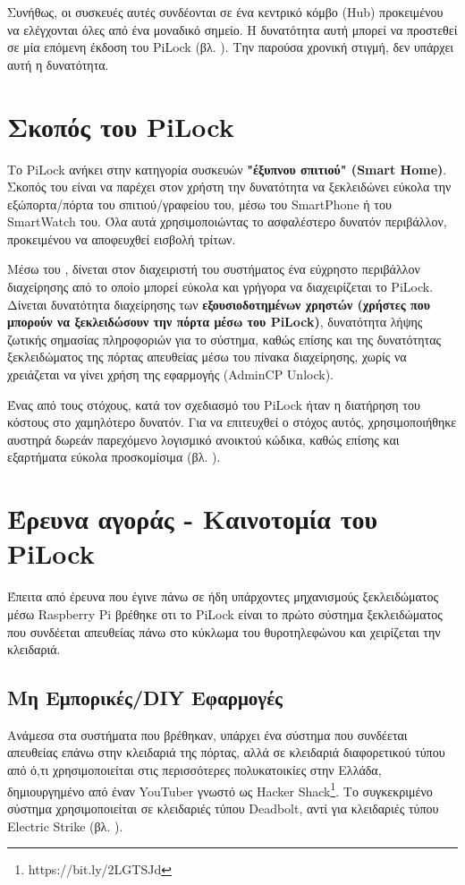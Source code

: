 	Συνήθως, οι συσκευές αυτές συνδέονται σε ένα κεντρικό κόμβο (Hub) προκειμένου να ελέγχονται όλες από ένα μοναδικό σημείο. Η δυνατότητα αυτή μπορεί να προστεθεί σε μία επόμενη έκδοση του PiLock (βλ. ). Την παρούσα χρονική στιγμή, δεν υπάρχει αυτή η δυνατότητα.

\section{Σκοπός του PiLock}
	Το PiLock ανήκει στην κατηγορία συσκευών \textbf{"έξυπνου σπιτιού" (Smart Home)}. Σκοπός του είναι να παρέχει στον χρήστη την δυνατότητα να ξεκλειδώνει εύκολα την εξώπορτα/πόρτα του σπιτιού/γραφείου του, μέσω του SmartPhone ή του SmartWatch του. Όλα αυτά χρησιμοποιώντας το ασφαλέστερο δυνατόν περιβάλλον, προκειμένου να αποφευχθεί εισβολή τρίτων.

	Μέσω του \textbf{}, δίνεται στον διαχειριστή του συστήματος ένα εύχρηστο περιβάλλον διαχείρησης από το οποίο μπορεί εύκολα και γρήγορα να διαχειρίζεται το PiLock. Δίνεται δυνατότητα διαχείρησης των \textbf{εξουσιοδοτημένων χρηστών (χρήστες που μπορούν να ξεκλειδώσουν την πόρτα μέσω του PiLock)}, δυνατότητα λήψης ζωτικής σημασίας πληροφοριών για το σύστημα, καθώς επίσης και της δυνατότητας ξεκλειδώματος της πόρτας απευθείας μέσω του πίνακα διαχείρησης, χωρίς να χρειάζεται να γίνει χρήση της εφαρμογής (AdminCP Unlock).

	Ένας από τους στόχους, κατά τον σχεδιασμό του PiLock ήταν η διατήρηση του κόστους στο χαμηλότερο δυνατόν. Για να επιτευχθεί ο στόχος αυτός, χρησιμοποιήθηκε αυστηρά δωρεάν παρεχόμενο λογισμικό ανοικτού κώδικα, καθώς επίσης και εξαρτήματα εύκολα προσκομίσιμα (βλ. ).

\section{Έρευνα αγοράς - Καινοτομία του PiLock}
	Έπειτα από έρευνα που έγινε πάνω σε ήδη υπάρχοντες μηχανισμούς ξεκλειδώματος μέσω Raspberry Pi βρέθηκε οτι το PiLock είναι το πρώτο σύστημα ξεκλειδώματος που συνδέεται απευθείας πάνω στο κύκλωμα του θυροτηλεφώνου και χειρίζεται την κλειδαριά. 

	\subsection{Μη Εμπορικές/DIY Εφαρμογές}
		Ανάμεσα στα συστήματα που βρέθηκαν, υπάρχει ένα σύστημα που συνδέεται απευθείας επάνω στην κλειδαριά της πόρτας, αλλά σε κλειδαριά διαφορετικού τύπου από ό,τι χρησιμοποιείται στις περισσότερες πολυκατοικίες στην Ελλάδα, δημιουργημένο από έναν YouTuber γνωστό ως Hacker Shack\footnote{https://bit.ly/2LGTSJd}. Το συγκεκριμένο σύστημα χρησιμοποιείται σε κλειδαριές τύπου Deadbolt, αντί για κλειδαριές τύπου Electric Strike (βλ. ).

